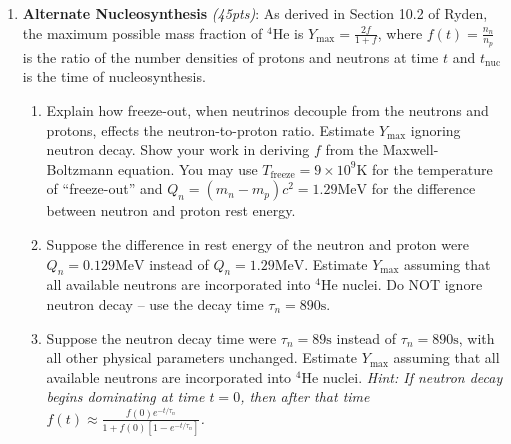 \documentclass[12pt,preprint]{aastex}
\def\K{\mathrm{K}}
\def\s{\mathrm{s}}
\def\MeV{\mathrm{MeV}}
\newcommand\sn[2]{#1 \times 10^{#2}}
\def\Ymax{Y_{\mathrm{max}}}
\def\He{^4\mathrm{He}}
\def\tnuc{t_{\mathrm{nuc}}}
\begin{document}
\begin{enumerate}
\item \textbf{Alternate Nucleosynthesis} \textit{(45pts)}: 
	As derived in Section 10.2 of Ryden, the maximum possible mass fraction of $\He$ is $\Ymax = \frac{2f}{1+f}$, where $f(t) = \frac{n_n}{n_p}$ is the ratio of the number densities of protons and neutrons at time $t$ and $\tnuc$ is the time of nucleosynthesis.  
	\begin{enumerate}
	\item Explain how freeze-out, when neutrinos decouple from the neutrons and protons, effects the neutron-to-proton ratio. Estimate $\Ymax$ ignoring neutron decay. Show your work in deriving $f$ from the Maxwell-Boltzmann equation. You may use $T_{\mathrm{freeze}} = \sn{9}{9} \K$ for the temperature of ``freeze-out'' and $Q_n = (m_n - m_p)c^2 = 1.29 \MeV$ for the difference between neutron and proton rest energy.
	\item Suppose the difference in rest energy of the neutron and proton were $Q_n = 0.129 \MeV$ instead of $Q_n = 1.29 \MeV$. Estimate $\Ymax$ assuming that all available neutrons are incorporated into $\He$ nuclei. Do NOT ignore neutron decay -- use the decay time $\tau_n = 890\s$. 
	\item Suppose the neutron decay time were $\tau_n = 89 \s$ instead of $\tau_n = 890 \s$, with all other physical parameters unchanged. Estimate $\Ymax$ assuming that all available neutrons are incorporated into $\He$ nuclei. \textit{Hint: If neutron decay begins dominating at time $t=0$, then after that time $f(t) \approx \frac{f(0) e^{-t/\tau_n}}{1+f(0)[1-e^{-t/\tau_n}]}$.}
	\end{enumerate}


\end{enumerate}
\end{document}
